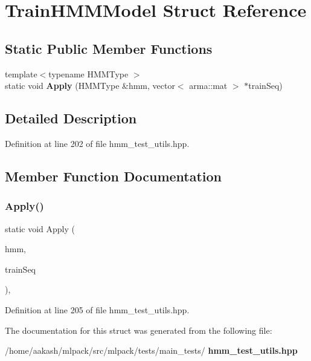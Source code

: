 \section{Train\+H\+M\+M\+Model Struct Reference}
\label{structTrainHMMModel}
\subsection*{Static Public Member Functions}
\begin{DoxyCompactItemize}
\item 
{\footnotesize template$<$typename H\+M\+M\+Type $>$ }\\static void \textbf{ Apply} (H\+M\+M\+Type \&hmm, vector$<$ arma\+::mat $>$ $\ast$train\+Seq)
\end{DoxyCompactItemize}


\subsection{Detailed Description}


Definition at line 202 of file hmm\+\_\+test\+\_\+utils.\+hpp.



\subsection{Member Function Documentation}
\mbox{\label{structTrainHMMModel_a513815d8b32a9a55939317f8bfc48321}} 
\subsubsection{Apply()}
{\footnotesize\ttfamily static void Apply (\begin{DoxyParamCaption}\item[{H\+M\+M\+Type \&}]{hmm,  }\item[{vector$<$ arma\+::mat $>$ $\ast$}]{train\+Seq }\end{DoxyParamCaption})\hspace{0.3cm}{\ttfamily [inline]}, {\ttfamily [static]}}



Definition at line 205 of file hmm\+\_\+test\+\_\+utils.\+hpp.



The documentation for this struct was generated from the following file\+:\begin{DoxyCompactItemize}
\item 
/home/aakash/mlpack/src/mlpack/tests/main\+\_\+tests/\textbf{ hmm\+\_\+test\+\_\+utils.\+hpp}\end{DoxyCompactItemize}
